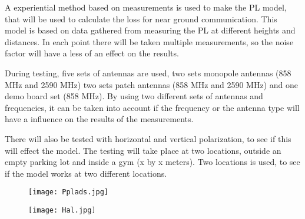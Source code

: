 A experiential method based on measurements is used to make the PL model, that will be used to calculate the loss for near ground communication. This model is based on data gathered from measuring the PL at different heights and distances. In each point there will be taken multiple measurements, so the noise factor will have a less of an effect on the results.

During testing, five sets of antennas are used, two sets monopole antennas (858 MHz and 2590 MHz) two sets patch antennas (858 MHz and 2590 MHz) and one demo board set (858 MHz). By using two different sets of antennas and frequencies, it can be taken into account if the frequency or the antenna type will have a influence on the results of the measurements. 

There will also be tested with horizontal and vertical polarization, to see if this will effect the model. The testing will take place at two locations, outside an empty parking lot and inside a gym (x by x meters). Two locations is used, to see if the model works at two different locations.



\begin{figure}
\centering
\begin{minipage}{.2\textwidth}
  \centering
  \texttt{[image: Pplads.jpg]}
  \label{fig:test1}
\end{minipage}%
\hspace{2mm}
\begin{minipage}{.2\textwidth}
  \centering
  \texttt{[image: Hal.jpg]}
  \label{fig:test2}
\end{minipage}
\end{figure}
